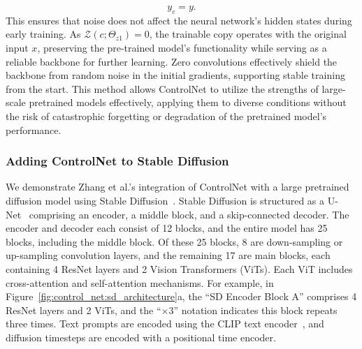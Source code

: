 \[
    y_c = y.
\]
This ensures that noise does not affect the neural network's hidden states during early training. As $\mathcal{Z}(c; \Theta_{z1}) = 0$, the trainable copy operates with the original input $x$, preserving the pre-trained model's functionality while serving as a reliable backbone for further learning. Zero convolutions effectively shield the backbone from random noise in the initial gradients, supporting stable training from the start. This method allows ControlNet to utilize the strengths of large-scale pretrained models effectively, applying them to diverse conditions without the risk of catastrophic forgetting or degradation of the pretrained model's performance.

\subsubsection{Adding ControlNet to Stable Diffusion}
We demonstrate Zhang et al.'s integration of ControlNet with a large pretrained diffusion model using Stable Diffusion~\cite{rombach2022stablediffusion}. Stable Diffusion is structured as a U-Net~\cite{ronneberger2015unetconvolutionalnetworksbiomedical} comprising an encoder, a middle block, and a skip-connected decoder. The encoder and decoder each consist of 12 blocks, and the entire model has 25 blocks, including the middle block. Of these 25 blocks, 8 are down-sampling or up-sampling convolution layers, and the remaining 17 are main blocks, each containing 4 ResNet layers and 2 Vision Transformers (ViTs). Each ViT includes cross-attention and self-attention mechanisms. For example, in Figure~\ref{fig:control_net:sd_architecture}a, the ``SD Encoder Block A'' comprises 4 ResNet layers and 2 ViTs, and the ``$\times$3'' notation indicates this block repeats three times. Text prompts are encoded using the CLIP text encoder~\cite{radford2021learningtransferablevisualmodels}, and diffusion timesteps are encoded with a positional time encoder.
